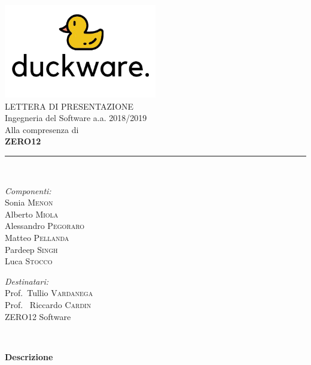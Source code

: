 \documentclass[a4paper,11pt]{article}
\newcommand{\descript}{}
\begin{document}
\begin{titlepage}
\begin{center}
\includegraphics[width=0.5\textwidth]{logo}\\
{\large LETTERA DI PRESENTAZIONE\\Ingegneria del Software a.a. 2018/2019}\\[0.5cm]
{\large Alla compresenza di\\ \textbf{ZERO12}}\\[0.25cm]
\rule{\linewidth}{0.25mm} \\[1.0cm]

\noindent
\begin{minipage}{0.4\textwidth}
  \begin{flushleft} \large
    \emph{Componenti:}\\ [0.25cm]
    Sonia \textsc{Menon}\\
	Alberto \textsc{Miola}\\
	Alessandro \textsc{Pegoraro}\\	
	Matteo \textsc{Pellanda}\\    
	Pardeep \textsc{Singh}\\    
    Luca \textsc{Stocco}
  \end{flushleft}
\end{minipage}%
\begin{minipage}{0.4\textwidth}
  \begin{flushright} \large
    \emph{Destinatari:} \\ [0.25cm]
    Prof.~Tullio \textsc{Vardanega}\\
    Prof.\hspace{0.12cm} ~Riccardo \textsc{Cardin}\\
    ZERO12 Software\\
  \end{flushright}
\end{minipage}\\[1.0cm]


\begin{LARGE}
	\textbf{Descrizione}\\ [1.0cm]
\end{LARGE}
	\descript%
\vfill
\end{center}
\end{titlepage}
\end{document}
